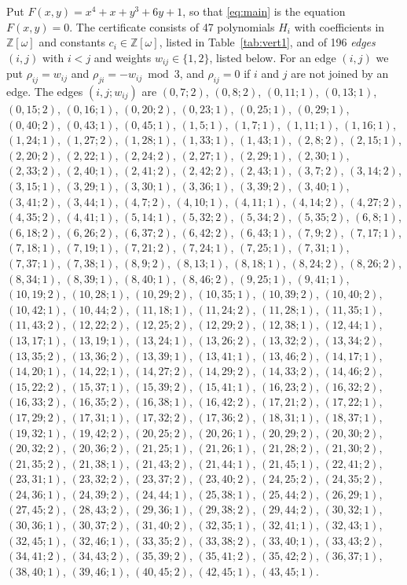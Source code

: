 \documentclass[11pt]{article}
\newcommand{\Z}{\mathbb{Z}}
\begin{document}
Put $F(x,y)=x^{4}+x+y^{3}+6y+1$, so that \eqref{eq:main} is the equation $F(x,y)=0$. The certificate consists of 47 polynomials $H_i$ with coefficients in $\Z[\omega]$ and constants $c_i\in\Z[\omega]$, listed in Table~\ref{tab:vert1}, and of 196 \emph{edges} $(i,j)$ with $i<j$ and weights $w_{ij}\in\{1,2\}$, listed below. For an edge $(i,j)$ we put $\rho_{ij}=w_{ij}$ and $\rho_{ji}=-w_{ij}\bmod 3$, and $\rho_{ij}=0$ if $i$ and $j$ are not joined by an edge.
The edges $(i,j;w_{ij})$ are $(0,7;2)$, $(0,8;2)$, $(0,11;1)$, $(0,13;1)$, $(0,15;2)$, $(0,16;1)$, $(0,20;2)$, $(0,23;1)$, $(0,25;1)$, $(0,29;1)$, $(0,40;2)$, $(0,43;1)$, $(0,45;1)$, $(1,5;1)$, $(1,7;1)$, $(1,11;1)$, $(1,16;1)$, $(1,24;1)$, $(1,27;2)$, $(1,28;1)$, $(1,33;1)$, $(1,43;1)$, $(2,8;2)$, $(2,15;1)$, $(2,20;2)$, $(2,22;1)$, $(2,24;2)$, $(2,27;1)$, $(2,29;1)$, $(2,30;1)$, $(2,33;2)$, $(2,40;1)$, $(2,41;2)$, $(2,42;2)$, $(2,43;1)$, $(3,7;2)$, $(3,14;2)$, $(3,15;1)$, $(3,29;1)$, $(3,30;1)$, $(3,36;1)$, $(3,39;2)$, $(3,40;1)$, $(3,41;2)$, $(3,44;1)$, $(4,7;2)$, $(4,10;1)$, $(4,11;1)$, $(4,14;2)$, $(4,27;2)$, $(4,35;2)$, $(4,41;1)$, $(5,14;1)$, $(5,32;2)$, $(5,34;2)$, $(5,35;2)$, $(6,8;1)$, $(6,18;2)$, $(6,26;2)$, $(6,37;2)$, $(6,42;2)$, $(6,43;1)$, $(7,9;2)$, $(7,17;1)$, $(7,18;1)$, $(7,19;1)$, $(7,21;2)$, $(7,24;1)$, $(7,25;1)$, $(7,31;1)$, $(7,37;1)$, $(7,38;1)$, $(8,9;2)$, $(8,13;1)$, $(8,18;1)$, $(8,24;2)$, $(8,26;2)$, $(8,34;1)$, $(8,39;1)$, $(8,40;1)$, $(8,46;2)$, $(9,25;1)$, $(9,41;1)$, $(10,19;2)$, $(10,28;1)$, $(10,29;2)$, $(10,35;1)$, $(10,39;2)$, $(10,40;2)$, $(10,42;1)$, $(10,44;2)$, $(11,18;1)$, $(11,24;2)$, $(11,28;1)$, $(11,35;1)$, $(11,43;2)$, $(12,22;2)$, $(12,25;2)$, $(12,29;2)$, $(12,38;1)$, $(12,44;1)$, $(13,17;1)$, $(13,19;1)$, $(13,24;1)$, $(13,26;2)$, $(13,32;2)$, $(13,34;2)$, $(13,35;2)$, $(13,36;2)$, $(13,39;1)$, $(13,41;1)$, $(13,46;2)$, $(14,17;1)$, $(14,20;1)$, $(14,22;1)$, $(14,27;2)$, $(14,29;2)$, $(14,33;2)$, $(14,46;2)$, $(15,22;2)$, $(15,37;1)$, $(15,39;2)$, $(15,41;1)$, $(16,23;2)$, $(16,32;2)$, $(16,33;2)$, $(16,35;2)$, $(16,38;1)$, $(16,42;2)$, $(17,21;2)$, $(17,22;1)$, $(17,29;2)$, $(17,31;1)$, $(17,32;2)$, $(17,36;2)$, $(18,31;1)$, $(18,37;1)$, $(19,32;1)$, $(19,42;2)$, $(20,25;2)$, $(20,26;1)$, $(20,29;2)$, $(20,30;2)$, $(20,32;2)$, $(20,36;2)$, $(21,25;1)$, $(21,26;1)$, $(21,28;2)$, $(21,30;2)$, $(21,35;2)$, $(21,38;1)$, $(21,43;2)$, $(21,44;1)$, $(21,45;1)$, $(22,41;2)$, $(23,31;1)$, $(23,32;2)$, $(23,37;2)$, $(23,40;2)$, $(24,25;2)$, $(24,35;2)$, $(24,36;1)$, $(24,39;2)$, $(24,44;1)$, $(25,38;1)$, $(25,44;2)$, $(26,29;1)$, $(27,45;2)$, $(28,43;2)$, $(29,36;1)$, $(29,38;2)$, $(29,44;2)$, $(30,32;1)$, $(30,36;1)$, $(30,37;2)$, $(31,40;2)$, $(32,35;1)$, $(32,41;1)$, $(32,43;1)$, $(32,45;1)$, $(32,46;1)$, $(33,35;2)$, $(33,38;2)$, $(33,40;1)$, $(33,43;2)$, $(34,41;2)$, $(34,43;2)$, $(35,39;2)$, $(35,41;2)$, $(35,42;2)$, $(36,37;1)$, $(38,40;1)$, $(39,46;1)$, $(40,45;2)$, $(42,45;1)$, $(43,45;1)$.
\end{document}
